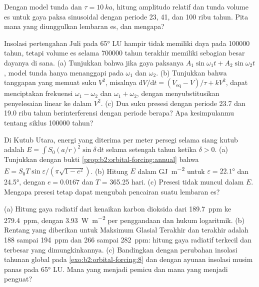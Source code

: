 \begin{exercise}[$\star\star$]\label{exo:b2:orbital-forcing:9}
Dengan model tunda dan $\tau = \qty{10}{ka}$, hitung amplitudo relatif dan tunda
volume es untuk gaya paksa sinusoidal dengan periode 23, 41, dan \num{100} ribu tahun. Pita mana yang
diunggulkan lembaran es, dan mengapa?
\end{exercise}

\begin{exercise}[$\star\star\star$]\label{exo:b2:orbital-forcing:10}
Insolasi pertengahan Juli pada \ang{65} LU hampir tidak memiliki daya pada \num{100000} tahun, tetapi volume es
selama \num{700000} tahun terakhir memiliki sebagian besar dayanya di sana. (a) Tunjukkan bahwa jika gaya paksanya $A_1\sin
\omega_1 t + A_2\sin\omega_2 t$, model tunda hanya menanggapi pada $\omega_1$ dan $\omega_2$. (b) Tunjukkan
bahwa tanggapan yang memuat suku $V^2$, misalnya $\mathrm dV/\mathrm dt = (V_{\mathrm{eq}} -
V)/\tau + kV^2$, dapat menciptakan frekuensi $\omega_1 - \omega_2$ dan $\omega_1 + \omega_2$, dengan
menyubstitusikan penyelesaian linear ke dalam $V^2$. (c) Dua suku presesi dengan periode \num{23.7} dan
\num{19.0} ribu tahun berinterferensi dengan periode berapa? Apa kesimpulanmu tentang siklus
\num{100000} tahun?
\end{exercise}

\begin{exercise}[$\star\star\star$]\label{exo:b2:orbital-forcing:11}
Di Kutub Utara, energi yang diterima per meter persegi selama siang kutub adalah $E = \int S_0(a/r)^2
\sin\delta\,\mathrm dt$ selama setengah tahun ketika $\delta > 0$. (a) Tunjukkan dengan bukti
\cref{prop:b2:orbital-forcing:annual} bahwa $E = S_0T\sin\varepsilon/(\pi\sqrt{1 - e^2})$. (b) Hitung
$E$ dalam \unit{GJ.m^{-2}} untuk $\varepsilon = \ang{22.1}$ dan \ang{24.5}, dengan $e = 0.0167$ dan $T$ =
365.25 hari. (c) Presesi tidak muncul dalam $E$. Mengapa presesi tetap dapat mengubah
pencairan suatu lembaran es?
\end{exercise}

\begin{exercise}[$\star\star\star$]\label{exo:b2:orbital-forcing:12}
(a) Hitung gaya radiatif dari kenaikan karbon dioksida dari \qty{189.7}{ppm} ke
\qty{279.4}{ppm}, dengan \qty{3.93}{W.m^{-2}} per penggandaan dan hukum logaritmik. (b) Rentang
yang diberikan untuk Maksimum Glasial Terakhir dan  terakhir adalah 188 sampai \qty{194}{ppm} dan 266 sampai
\qty{282}{ppm}: hitung gaya radiatif terkecil dan terbesar yang dimungkinkannya. (c) Bandingkan dengan perubahan
insolasi tahunan global pada \cref{exo:b2:orbital-forcing:8} dan dengan ayunan insolasi
musim panas pada \ang{65} LU. Mana yang menjadi pemicu dan mana yang menjadi penguat?
\end{exercise}

